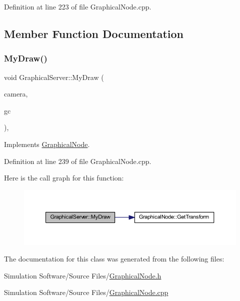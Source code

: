Definition at line 223 of file Graphical\+Node.\+cpp.



\subsection{Member Function Documentation}
\mbox{\label{class_graphical_server_ad144b6cfdf945981fd0db425dfc41e5b}} 
\subsubsection{\texorpdfstring{My\+Draw()}{MyDraw()}}
{\footnotesize\ttfamily void Graphical\+Server\+::\+My\+Draw (\begin{DoxyParamCaption}\item[{const wx\+Affine\+Matrix2D \&}]{camera,  }\item[{wx\+Graphics\+Context $\ast$}]{gc }\end{DoxyParamCaption})\hspace{0.3cm}{\ttfamily [override]}, {\ttfamily [virtual]}}



Implements \hyperlink{class_graphical_node_a4a5d4f48454a9721a940499d4f59b0ce}{Graphical\+Node}.



Definition at line 239 of file Graphical\+Node.\+cpp.

Here is the call graph for this function\+:
\nopagebreak
\begin{figure}[H]
\begin{center}
\leavevmode
\includegraphics[width=350pt]{class_graphical_server_ad144b6cfdf945981fd0db425dfc41e5b_cgraph}
\end{center}
\end{figure}


The documentation for this class was generated from the following files\+:\begin{DoxyCompactItemize}
\item 
Simulation Software/\+Source Files/\hyperlink{_graphical_node_8h}{Graphical\+Node.\+h}\item 
Simulation Software/\+Source Files/\hyperlink{_graphical_node_8cpp}{Graphical\+Node.\+cpp}\end{DoxyCompactItemize}
